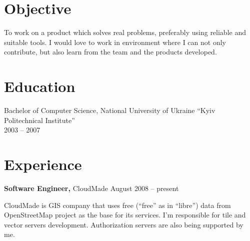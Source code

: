 \documentclass[margin]{res}
\begin{document}

\address{{\bf Address} \\ 19-345 General Naumov Street \\ Kyiv, Ukraine, 03164}

\address{{\bf Contacts} \\ +380 (50) 353-09-33 \\ contact@mishkovskyi.net \\ skype: andriy.mishkovskyy \\ \href{http://mishkovskyi.net}{mishkovskyi.net}}

\begin{resume}

\section{Objective}
To work on a product which solves real problems, preferably using reliable and
suitable tools. I would love to work in environment where I can not only contribute, but also
learn from the team and the products developed.

\section{Education}
Bachelor of Computer Science, National University of Ukraine ``Kyiv Politechnical Institute'' \\
2003 -- 2007

\section{Experience}
{\bf Software Engineer,} CloudMade \hfill August 2008 -- present

CloudMade is GIS company that uses free
(``free'' as in ``libre'') data from OpenStreetMap project as
the base for its services. I'm responsible for tile and
vector servers development. Authorization servers are also
being supported by me.\\


\end{resume}
\end{document}
